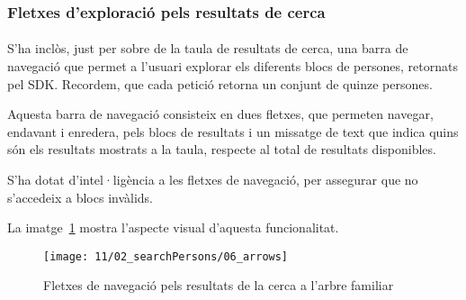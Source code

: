 \subsubsection{Fletxes d'exploració pels resultats de cerca}

\paragraph{}
S'ha inclòs, just per sobre de la taula de resultats de cerca, una barra de navegació que permet a l'usuari explorar els diferents blocs de persones, retornats pel SDK. Recordem, que cada petició retorna un conjunt de quinze persones.

Aquesta barra de navegació consisteix en dues fletxes, que permeten navegar, endavant i enredera, pels blocs de resultats i un missatge de text que indica quins són els resultats mostrats a la taula, respecte al total de resultats disponibles.

S'ha dotat d’intel·ligència a les fletxes de navegació, per assegurar que no s'acce\-deix a blocs invàlids.

La imatge~\ref{fig:arrowsPersonSearch} mostra l’aspecte visual d’aquesta funcionalitat.

\begin{figure}[h]
    \texttt{[image: 11/02\_searchPersons/06\_arrows]}
    \centering
    \caption{Fletxes de navegació pels resultats de la cerca a l'arbre familiar}\label{fig:arrowsPersonSearch}
\end{figure}

